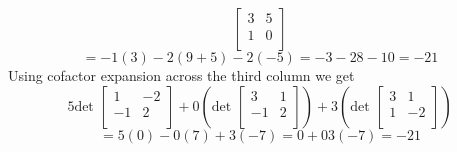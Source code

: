 \documentclass{report}
\begin{document}
{\[\begin{bmatrix}
                         3 & 5\\
                         1 & 0\\
                         \end{bmatrix}
                 \]
                        \[
                                = -1\left( 3 \right) -2\left( 9 +5 \right) -2\left( -5 \right) = -3-28-10 = -21
                        \]
                        Using cofactor expansion across the third column we get
                        \[
                                5 \text{det } \begin{bmatrix}
                                1 & -2\\
                                -1 & 2\\
                                \end{bmatrix} +0\left( \text{det } \begin{bmatrix}
                                3 & 1\\
                                -1 & 2\\
                                \end{bmatrix} \right) +3\left( \text{det } \begin{bmatrix}
                                3 & 1\\
                                1 & -2\\
                                \end{bmatrix} \right)
                        \]
                        \[
                                = 5\left( 0 \right) -0\left( 7 \right) +3\left(  -7 \right) = 0 +0 3\left( -7 \right)  = -21
                        \]
        }
\end{document}
